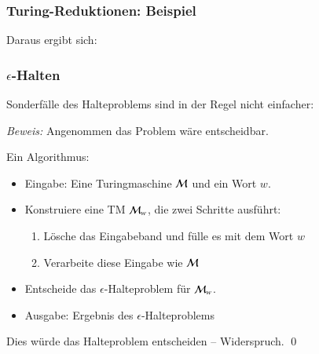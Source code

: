 \documentclass[aspectratio=1610,onlymath]{beamer}
\begin{document}
\begin{frame}\frametitle{Turing-Reduktionen: Beispiel}

\bigskip\pause

Daraus ergibt sich:\medskip


\end{frame}

\begin{frame}\frametitle{$\epsilon$-Halten}

Sonderfälle des Halteproblems sind in der Regel nicht einfacher:\medskip

\medskip\pause

\pause

\emph{Beweis:} Angenommen das Problem wäre entscheidbar.\medskip

Ein Algorithmus:
\begin{itemize}
\item Eingabe: Eine Turingmaschine $\mathcal{M}$ und ein Wort $w$.
\item Konstruiere eine TM $\mathcal{M}_w$, die zwei Schritte ausführt:
	\begin{enumerate}[(1)]
	\item Lösche das Eingabeband und fülle es mit dem Wort $w$
	\item Verarbeite diese Eingabe wie $\mathcal{M}$ 
	\end{enumerate}
\item Entscheide das $\epsilon$-Halteproblem für $\mathcal{M}_w$.
\item Ausgabe: Ergebnis des $\epsilon$-Halteproblems
\end{itemize}\pause

Dies würde das Halteproblem entscheiden -- Widerspruch. \qed

\end{frame}
\end{document}
